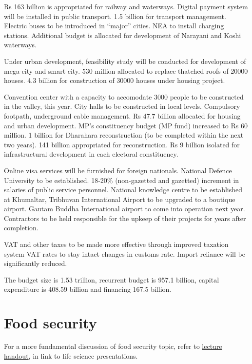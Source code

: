 \documentclass[
  openany]{book}
\begin{document}
Rs 163 billion is appropriated for railway and waterways. Digital payment system will be installed in public transport. 1.5 billion for transport management. Electric buses to be introduced in ``major'' cities. NEA to install charging stations. Additional budget is allocated for development of Narayani and Koshi waterways.

Under urban development, feasibility study will be conducted for development of mega-city and smart city. 530 million allocated to replace thatched roofs of 20000 houses. 4.3 billion for construction of 30000 houses under housing project.

Convention center with a capacity to accomodate 3000 people to be constructed in the valley, this year. City halls to be constructed in local levels. Compulsory footpath, underground cable management. Rs 47.7 billion allocated for housing and urban development. MP's constituency budget (MP fund) increased to Rs 60 million. 1 billion for Dharahara reconstruction (to be completed within the next two years). 141 billion appropriated for reconstruction. Rs 9 billion isolated for infrastructural development in each electoral constituency.

Online visa services will be furnished for foreign nationals. National Defence University to be established. 18-20\% (non-gazetted and gazetted) increment in salaries of public service personnel. National knowledge centre to be established at Khumaltar, Tribhuvan International Airport to be upgraded to a boutique airport. Gautam Buddha International airport to come into operation next year. Contractors to be held responsible for the upkeep of their projects for years after completion.

VAT and other taxes to be made more effective through improved taxation system VAT rates to stay intact changes in customs rate. Import reliance will be significantly reduced.

The budget size is 1.53 trillion, recurrent budget is 957.1 billion, capital expenditure is 408.59 billion and financing 167.5 billion.

\hypertarget{food-security}{%
\section{Food security}\label{food-security}}

For a more fundamental discussion of food security topic, refer to \href{https://github.com/DeependraD/life_science_presentations/raw/master/food_security.pdf}{lecture handout}, in link to life science presentations.
\end{document}
